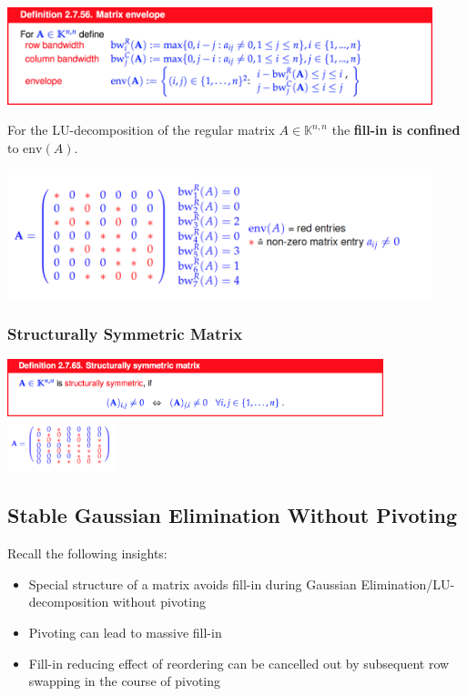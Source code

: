 \documentclass[12pt, a4paper]{article}
\newcommand{\K}{\mathbb{K}}
\begin{document}
\begin{center}
	\includegraphics[width=350pt]{envelope}
\end{center}

For the LU-decomposition of the regular matrix $A \in \K^{n,n}$ the \textbf{fill-in is confined} to $\text{env}(A)$.

\begin{center}
	\includegraphics[width=350pt]{envelope2.png}
\end{center}

\subsubsection{Structurally Symmetric Matrix}

\begin{center}
	\includegraphics[width=310pt]{ssmatrix.png}
	\includegraphics[width=0.24\textwidth]{strucSymMatrix.png}
\end{center}

\subsection{Stable Gaussian Elimination Without Pivoting}

Recall the following insights:
\begin{itemize}[noitemsep]
	\item Special structure of a matrix avoids fill-in during Gaussian Elimination/LU-decomposition without pivoting
	\item Pivoting can lead to massive fill-in
	\item Fill-in reducing effect of reordering can be cancelled out by subsequent row swapping in the course of pivoting 
\end{itemize}
\end{document}
